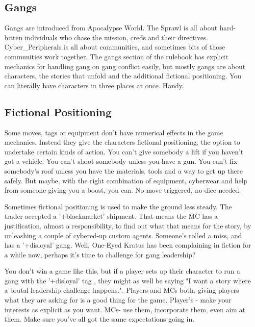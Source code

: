 \documentclass{tufte-book}
\begin{document}
\subsection{Gangs}
Gangs are introduced from Apocalypse World. The Sprawl is all about hard-bitten individuals who chase the mission, creds and their directives. Cyber\_Peripherals is all about communities, and sometimes bits of those communities work together. The gangs section of the rulebook has explicit mechanics for handling gang on gang conflict easily, but mostly gangs are about characters, the stories that unfold and the additional fictional positioning. You can literally have characters in three places at once. Handy.

\subsection{Fictional Positioning}
Some moves, tags or equipment don't have numerical effects in the game mechanics. Instead they give the characters fictional positioning, the option to undertake certain kinds of action. You can't give somebody a lift if you haven't got a vehicle. You can't shoot somebody unless you have a gun. You can't fix somebody's roof unless you have the materials, tools and a way to get up there safely. But maybe, with the right combination of equipment, cyberwear and help from someone giving you a boost, you can. No move triggered, no dice needed.

Sometimes fictional positioning is used to make the ground less steady. The trader accepted a '+blackmarket' shipment. That means the MC has a justification, almost a responsibility, to find out what that means for the story, by unleashing a couple of cybered-up custom agents. Someone's rolled a miss, and has a '+disloyal' gang. Well, One-Eyed Kratus has been complaining in fiction for a while now, perhaps it's time to challenge for gang leadership? 

You don't win a game like this, but if a player sets up their character to run a gang with the '+disloyal' tag , they might as well be saying "I want a story where a brutal leadership challenge happens.". Players and MCs both, giving players what they are asking for is a good thing for the game. Player's -  make your interests as explicit as you want. MCs- use them, incorporate them, even aim at them. Make sure you've all got the same expectations going in. 



\mainmatter
\end{document}
